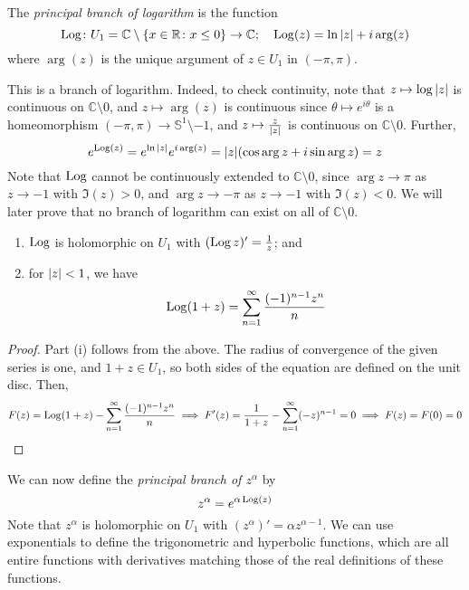 \begin{definition}
	The \textit{principal branch of logarithm} is the function
	\[
		\operatorname{Log} \colon U_1 = \mathbb C \setminus \qty{x \in \mathbb R \colon x \leq 0} \to \mathbb C;\quad \operatorname{Log}(z) = \ln\abs{z} + i \arg(z)
	\]
	where \( \arg(z) \) is the unique argument of \( z \in U_1 \) in \( (-\pi, \pi) \).
\end{definition}
This is a branch of logarithm.
Indeed, to check continuity, note that \( z \mapsto \log\abs{z} \) is continuous on \( \mathbb C \setminus \qty{0} \), and \( z \mapsto \arg(z) \) is continuous since \( \theta \mapsto e^{i\theta} \) is a homeomorphism \( (-\pi, \pi) \to \mathbb S^1 \setminus \qty{-1} \), and \( z \mapsto \frac{z}{\abs{z}} \) is continuous on \( \mathbb C \setminus \qty{0} \).
Further,
\[
	e^{\operatorname{Log}(z)} = e^{\ln\abs{z}} e^{i \arg(z)} = \abs{z} \qty(\cos \arg z + i \sin \arg z) = z
\]
Note that \( \operatorname{Log} \) cannot be continuously extended to \( \mathbb C \setminus \qty{0} \), since \( \arg z \to \pi \) as \( z \to -1 \) with \( \Im(z) > 0 \), and \( \arg z \to -\pi \) as \( z \to -1 \) with \( \Im(z) < 0 \).
We will later prove that no branch of logarithm can exist on all of \( \mathbb C \setminus \qty{0} \).
\begin{proposition}
	\begin{enumerate}
		\item \( \operatorname{Log} \) is holomorphic on \( U_1 \) with \( (\operatorname{Log} z)' = \frac{1}{z} \); and
		\item for \( \abs{z} < 1 \), we have
		      \[
			      \operatorname{Log}(1+z) = \sum_{n=1}^\infty \frac{(-1)^{n-1} z^n}{n}
		      \]
	\end{enumerate}
\end{proposition}
\begin{proof}
	Part (i) follows from the above.
	The radius of convergence of the given series is one, and \( 1 + z \in U_1 \), so both sides of the equation are defined on the unit disc.
	Then,
	\[
		F(z) = \operatorname{Log}(1+z) - \sum_{n=1}^\infty \frac{(-1)^{n-1}z^n}{n} \implies F'(z) = \frac{1}{1+z} - \sum_{n=1}^\infty (-z)^{n-1} = 0 \implies F(z) = F(0) = 0
	\]
\end{proof}
We can now define the \textit{principal branch of \( z^\alpha \)} by
\[
	z^\alpha = e^{\alpha \operatorname{Log}(z)}
\]
Note that \( z^\alpha \) is holomorphic on \( U_1 \) with \( (z^\alpha)' = \alpha z^{\alpha - 1} \).
We can use exponentials to define the trigonometric and hyperbolic functions, which are all entire functions with derivatives matching those of the real definitions of these functions.

